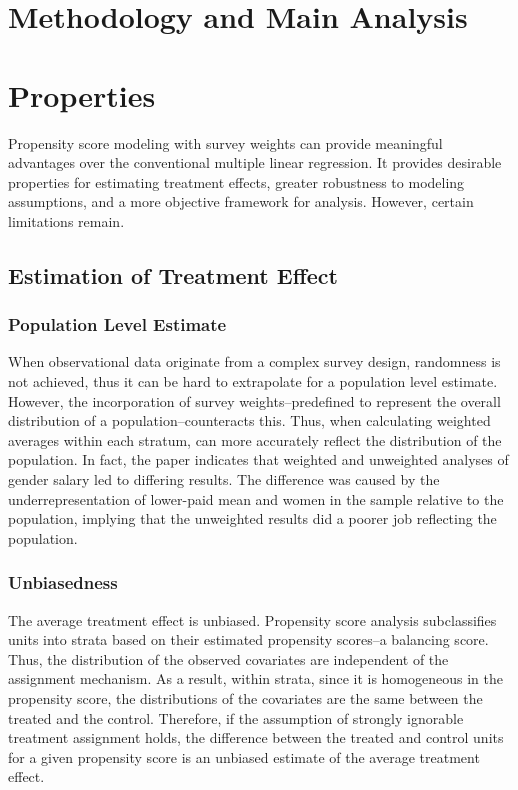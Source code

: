\documentclass[12pt]{article}
\begin{document}
\section{Methodology and Main Analysis}

\section{Properties}

Propensity score modeling with survey weights can provide meaningful advantages over the conventional multiple linear regression. It provides desirable properties for estimating treatment effects, greater robustness to modeling assumptions, and a more objective framework for analysis. However, certain limitations remain.

\subsection{Estimation of Treatment Effect} 

\subsubsection{Population Level Estimate}

When observational data originate from a complex survey design, randomness is not achieved, thus it can be hard to extrapolate for a population level estimate. However, the incorporation of survey weights--predefined to represent the overall distribution of a population--counteracts this. Thus, when calculating weighted averages within each stratum, can more accurately reflect the distribution of the population. In fact, the paper indicates that weighted and unweighted analyses of gender salary led to differing results. The difference was caused by the underrepresentation of lower-paid mean and women in the sample relative to the population, implying that the unweighted results did a poorer job reflecting the population.

\subsubsection{Unbiasedness}

The average treatment effect is unbiased. Propensity score analysis subclassifies units into strata based on their estimated propensity scores--a balancing score. Thus, the distribution of the observed covariates are independent of the assignment mechanism. As a result, within strata, since it is homogeneous in the propensity score, the distributions of the covariates are the same between the treated and the control. Therefore, if the assumption of strongly ignorable treatment assignment holds, the difference between the treated and control units for a given propensity score is an unbiased estimate of the average treatment effect.
\end{document}
